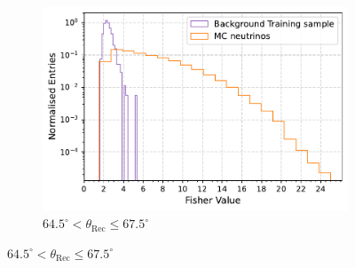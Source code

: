 \begin{figure}[h!]
\begin{subfigure}[l]{.48\textwidth}
      \includegraphics[width=\linewidth]{thesis_figures/Nu_analysis/Fisher_plots/Fisher_nu_bkg_region_64.5_67.5.pdf}
      \caption{$ 64.5^{\circ} <\theta_{\text{Rec}} \leq 67.5^{\circ}$}
    \end{subfigure}


\end{figure}
